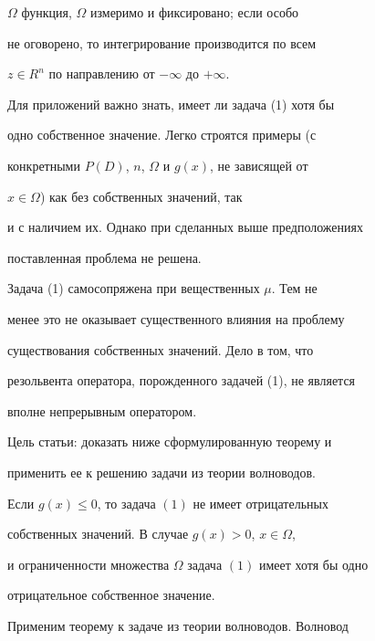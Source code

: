 $\Omega$ функция, $\Omega$ измеримо и фиксировано; если особо


не оговорено, то интегрирование производится по всем


$z \in R^{n}$ по направлению от $-\infty$ до $+\infty$.





Для приложений важно знать, имеет ли задача (1) хотя бы


одно собственное значение. Легко строятся примеры (с


конкретными $P(D)$, $n$, $\Omega$ и $g(x)$, не зависящей от 


$x \in \Omega$) как без собственных значений, так


и с наличием их. Однако при сделанных выше предположениях


поставленная проблема не решена.





Задача (1) самосопряжена при вещественных $\mu$. Тем не


менее это не оказывает существенного влияния на проблему


существования собственных значений. Дело в том, что


резольвента оператора, порожденного задачей (1), не является


вполне непрерывным оператором.





Цель статьи: доказать ниже сформулированную теорему и


применить ее к решению задачи из теории волноводов.





\begin{thmnonum}


Если $g(x) \le 0$, то задача $(1)$ не имеет отрицательных


собственных значений. В случае $g(x)>0$, $ x \in\Omega$,


и ограниченности множества $\Omega$ задача $(1)$ имеет хотя бы одно


отрицательное собственное значение.


\end{thmnonum}





Применим теорему к задаче из теории волноводов. Волновод


